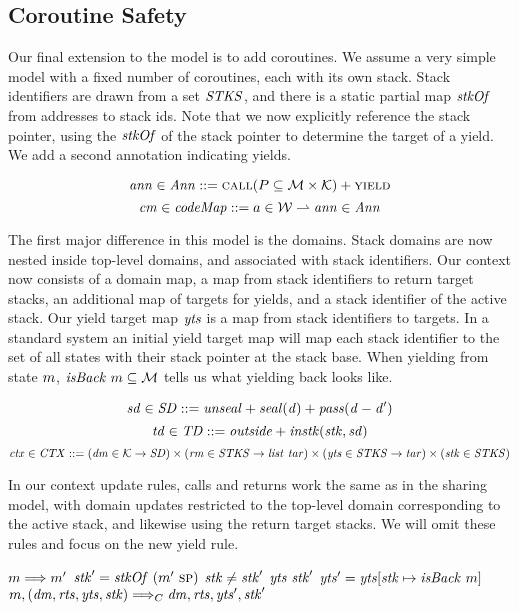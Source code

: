 \documentclass[acmsmall,review,anonymous]{acmart}\settopmatter{printfolios=true,printccs=false,printacmref=false}
\newcommand*{\rsp}{\textsc{sp}}
\begin{document}
\subsection{Coroutine Safety}

Our final extension to the model is to add coroutines. We assume a very simple model with
a fixed number of coroutines, each with its own stack.
Stack identifiers are drawn from a set \(\mathit{STKS}\), and there is a static partial map
\(\mathit{stkOf}\) from addresses to stack ids. Note that we now explicitly reference the stack
pointer, using the \(\mathit{stkOf}\) of the stack pointer to determine the target of a yield.
We add a second annotation indicating yields.

\[\mathit{ann} \in \mathit{Ann} ::= \text{\sc call}(P \subseteq {\mathcal M} \times {\mathcal K}) + \text{\sc yield}\]
\[\mathit{cm} \in \mathit{codeMap} ::= a \in {\mathcal W} \rightharpoonup \mathit{ann} \in \mathit{Ann}\]

The first major difference in this model is the domains. Stack domains are now nested inside
top-level domains, and associated with stack identifiers.
Our context now consists of a domain map, a map from stack identifiers to return target stacks,
an additional map of targets for yields, and a stack identifier of the active stack.
Our yield target map \(\mathit{yts}\) is a map from stack identifiers to targets.
In a standard system an initial yield target map will map each stack identifier to the
set of all states with their stack pointer at the stack base. When yielding from state \(m\),
\(\mathit{isBack} ~ m \subseteq {\mathcal M}\) tells us what yielding back looks like.

\[\mathit{sd} \in \mathit{SD} ::= \mathit{unseal} + \mathit{seal(d)} + \mathit{pass(d-d')}\]
\[\mathit{td} \in \mathit{TD} ::= \mathit{outside} + \mathit{instk}(\mathit{stk},\mathit{sd})\]
\[\mathit{ctx} \in \mathit{CTX} ::= (\mathit{dm} \in {\mathcal K} \rightarrow \mathit{SD}) \times
(\mathit{rm} \in \mathit{STKS} \rightarrow \mathit{list} ~ \mathit{tar}) \times (\mathit{yts} \in \mathit{STKS} \rightarrow
\mathit{tar}) \times (\mathit{stk} \in \mathit{STKS})\]

In our context update rules, calls and returns work the same as in the sharing model,
with domain updates restricted to the top-level domain corresponding to the active stack,
and likewise using the return target stacks. We will omit these rules and focus on the new yield rule.

\judgmentthreebr[Yield]
                {\(\codemap ~ (\mach ~ \PCname) = \yieldmap\)}
                {\(m \Longrightarrow m'\)}
                {\(\stackid' = \stackof ~ (\mach'~ \rsp)\)}
                {\(\mathit{stk} \not = \mathit{stk}'\)}
                {\(\mathit{yts} ~ \mathit{stk}'\)}
                {\(\mathit{yts}' = \mathit{yts}[\mathit{stk} \mapsto \mathit{isBack} ~ m]\)}
                {\(m,(\mathit{dm},\mathit{rts},\mathit{yts},\mathit{stk}) \Longrightarrow_C \mathit{dm},\mathit{rts},\mathit{yts}',\mathit{stk}'\)}
\end{document}
